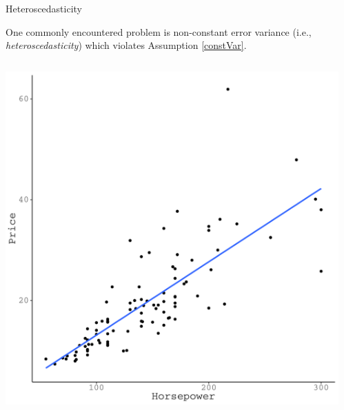 \documentclass{beamer}\usepackage[]{graphicx}\usepackage[]{color}
\makeatletter
\def\maxwidth{ %
  \ifdim\Gin@nat@width>\linewidth
    \linewidth
  \else
    \Gin@nat@width
  \fi
}
\newenvironment{knitrout}{}{} %
\makeatother
\begin{document}

\begin{frame}{Heteroscedasticity}
  
  One commonly encountered problem is non-constant error variance (i.e., 
  \emph{heteroscedasticity}) which violates Assumption \ref{constVar}.
  \vb
  \begin{columns}
    \begin{column}{0.5\textwidth}
      
\begin{knitrout}\footnotesize
{}\color{fgcolor}

{\centering \includegraphics[width=\maxwidth]{figure/unnamed-chunk-5-1} 

}



\end{knitrout}
\end{column}
    
    \begin{column}{0.5\textwidth}
      
\begin{knitrout}\footnotesize
{}\color{fgcolor}


\end{knitrout}
\end{column}
\end{columns}
\end{frame}
\end{document}
